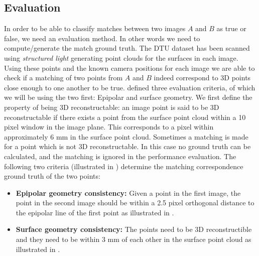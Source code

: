 \documentclass[thesis.tex]{subfiles}
\begin{document}
\subsection{Evaluation}
In order to be able to classify matches between two images $A$ and $B$ as true or false, we need an evaluation method. In other words we need to compute/generate the match ground truth. The DTU dataset has been scanned using \emph{structured light} generating point clouds for the surfaces in each image. Using these points and the known camera positions for each image we are able to check if a matching of two points from $A$ and $B$ indeed correspond to 3D points close enough to one another to be true. \citet{aanaes2010recall} defined three evaluation criteria, of which we will be using the two first: Epipolar and surface geometry. We first define the property of being 3D reconstructable: an image point is said to be 3D reconstructable if there exists a point from the surface point cloud within a 10 pixel window in the image plane. This corresponds to a pixel within approximately 6 mm in the surface point cloud. Sometimes a matching is made for a point which is not 3D reconstructable. In this case no ground truth can be calculated, and the matching is ignored in the performance evaluation. The following two criteria (illustrated in ) determine the matching correspondence ground truth of the two points:
\begin{itemize}
	\item \textbf{Epipolar geometry consistency:} Given a point in the first image, the point in the second image should be within a 2.5 pixel orthogonal distance to the epipolar line of the first point as illustrated in .
	\item \textbf{Surface geometry consistency:} The points need to be 3D reconstructible and they need to be within 3 mm of each other in the surface point cloud as illustrated in .
\end{itemize}

\end{document}
